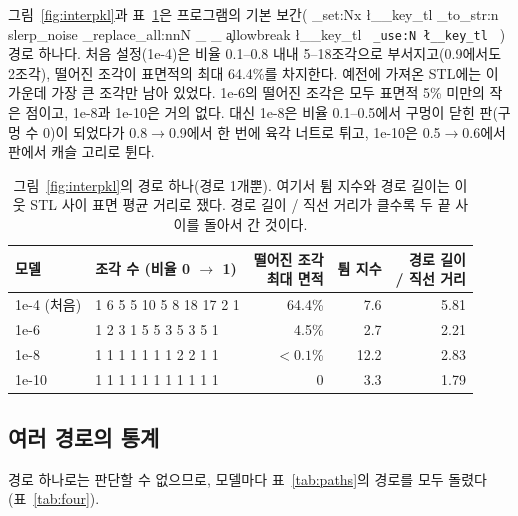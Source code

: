 \documentclass[11pt]{article}
\DeclareRobustCommand{\key}[1]{
  \tl_set:Nx \l__key_tl { \tl_to_str:n {#1} }
  \regex_replace_all:nnN { \_ } { \cO\_ \c{allowbreak} } \l__key_tl
  \texttt{ \tl_use:N \l__key_tl }
}
\begin{document}
그림~\ref{fig:interpkl}과 표~\ref{tab:figd}은 프로그램의 기본 보간(\key{slerp_noise}) 경로 하나다.
처음 설정(1e-4)은 비율 0.1--0.8 내내 5--18조각으로 부서지고(0.9에서도 2조각), 떨어진 조각이 표면적의 최대 64.4\%를 차지한다.
예전에 가져온 STL에는 이 가운데 가장 큰 조각만 남아 있었다. 1e-6의 떨어진 조각은 모두 표면적 5\% 미만의 작은 점이고,
1e-8과 1e-10은 거의 없다. 대신 1e-8은 비율 0.1--0.5에서 구멍이 닫힌 판(구멍 수 0)이 되었다가 0.8$\rightarrow$0.9에서 한 번에 육각 너트로
튀고, 1e-10은 0.5$\rightarrow$0.6에서 판에서 캐슬 고리로 튄다.

\begin{table}[htbp]
\centering\small
\begin{tabular}{l l r r r}
\toprule
모델 & 조각 수 (비율 0 $\rightarrow$ 1) & \shortstack[r]{떨어진 조각\\최대 면적} & 튐 지수 & \shortstack[r]{경로 길이\\/ 직선 거리} \\
\midrule
1e-4 (처음) & 1 6 5 5 10 5 8 18 17 2 1 & 64.4\% & 7.6 & 5.81 \\
1e-6 & 1 2 3 1 5 5 3 5 3 5 1 & 4.5\% & 2.7 & 2.21 \\
1e-8 & 1 1 1 1 1 1 1 2 2 1 1 & $<0.1$\% & 12.2 & 2.83 \\
1e-10 & 1 1 1 1 1 1 1 1 1 1 1 & 0 & 3.3 & 1.79 \\
\bottomrule
\end{tabular}
\caption{그림~\ref{fig:interpkl}의 경로 하나(경로 1개뿐). 여기서 튐 지수와 경로 길이는 이웃 STL 사이 표면 평균 거리로 쟀다.
경로 길이 / 직선 거리가 클수록 두 끝 사이를 돌아서 간 것이다.}
\label{tab:figd}
\end{table}

\subsection{여러 경로의 통계}

경로 하나로는 판단할 수 없으므로, 모델마다 표~\ref{tab:paths}의 경로를 모두 돌렸다(표~\ref{tab:four}).
\end{document}
